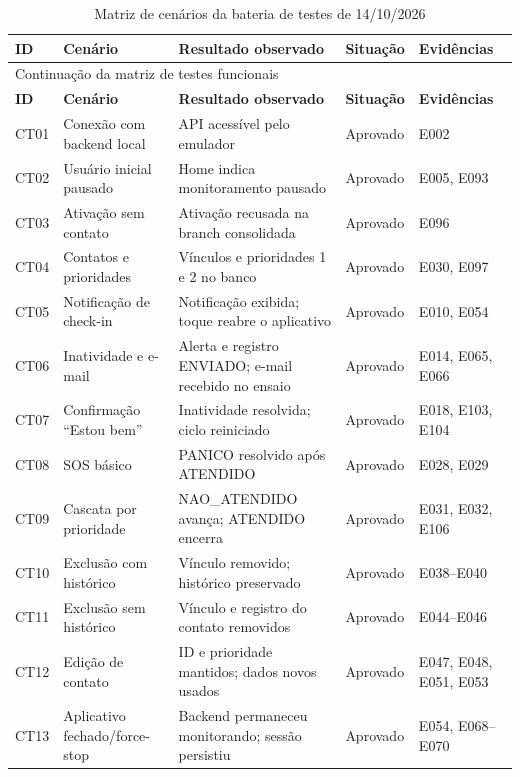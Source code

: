 \begingroup
\footnotesize
\renewcommand{\arraystretch}{1.12}
\begin{longtable}{p{1.0cm}p{3.3cm}p{4.3cm}p{2.0cm}p{2.1cm}}
\caption{Matriz de cenários da bateria de testes de 14/10/2026}\label{tab_validacao_integrada}\\
\hline
\textbf{ID} & \textbf{Cenário} & \textbf{Resultado observado} & \textbf{Situação} & \textbf{Evidências}\\\hline
\endfirsthead
\multicolumn{5}{l}{\footnotesize Continuação da matriz de testes funcionais}\\\hline
\textbf{ID} & \textbf{Cenário} & \textbf{Resultado observado} & \textbf{Situação} & \textbf{Evidências}\\\hline
\endhead
CT01 & Conexão com backend local & API acessível pelo emulador & Aprovado & E002\\\hline
CT02 & Usuário inicial pausado & Home indica monitoramento pausado & Aprovado & E005, E093\\\hline
CT03 & Ativação sem contato & Ativação recusada na branch consolidada & Aprovado & E096\\\hline
CT04 & Contatos e prioridades & Vínculos e prioridades 1 e 2 no banco & Aprovado & E030, E097\\\hline
CT05 & Notificação de check-in & Notificação exibida; toque reabre o aplicativo & Aprovado & E010, E054\\\hline
CT06 & Inatividade e e-mail & Alerta e registro ENVIADO; e-mail recebido no ensaio & Aprovado & E014, E065, E066\\\hline
CT07 & Confirmação ``Estou bem'' & Inatividade resolvida; ciclo reiniciado & Aprovado & E018, E103, E104\\\hline
CT08 & SOS básico & PANICO resolvido após ATENDIDO & Aprovado & E028, E029\\\hline
CT09 & Cascata por prioridade & NAO\_ATENDIDO avança; ATENDIDO encerra & Aprovado & E031, E032, E106\\\hline
CT10 & Exclusão com histórico & Vínculo removido; histórico preservado & Aprovado & E038--E040\\\hline
CT11 & Exclusão sem histórico & Vínculo e registro do contato removidos & Aprovado & E044--E046\\\hline
CT12 & Edição de contato & ID e prioridade mantidos; dados novos usados & Aprovado & E047, E048, E051, E053\\\hline
CT13 & Aplicativo fechado/force-stop & Backend permaneceu monitorando; sessão persistiu & Aprovado & E054, E068--E070\\\hline

\end{longtable}
